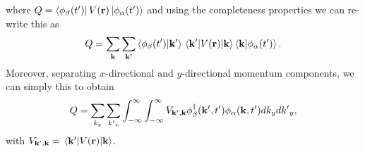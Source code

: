 \documentclass[
 reprint,
 amsmath,amssymb,
 aps,
 prb,
]{revtex4-2}
\begin{document}
where $Q = \bra{\phi_{\beta}(t')} V(\vb{r}) \ket{\phi_{\alpha}(t')}$ and using the completeness properties we can re-write this as
\begin{equation} \label{eq:c18}
    Q =
    \sum_{\vb{k}}\sum_{\vb{k'}}
    \braket{\phi_{\beta}(t')}{\vb{k'}}
    \mel{\vb{k'}}{V(\vb{r})}{\vb{k}}
    \braket{\vb{k}}{\phi_{\alpha}(t')}.
\end{equation}
Moreover, separating $x$-directional and $y$-directional momentum components, we can simply this to obtain
\begin{equation} \label{eq:c19}
    Q =
    \sum_{k_x}\sum_{{k'}_x}
    \int_{-\infty}^{\infty} \int_{-\infty}^{\infty}
    V_{\vb{k'},\vb{k}}
    \phi_{\beta}^{\dagger}(\vb{k'},t')
    \phi_{\alpha}(\vb{k},t')  dk_y d{k'}_y,
\end{equation}
with $V_{\vb{k'},\vb{k}} = \mel{\vb{k'}}{V(\vb{r})}{\vb{k}}$.
\end{document}
